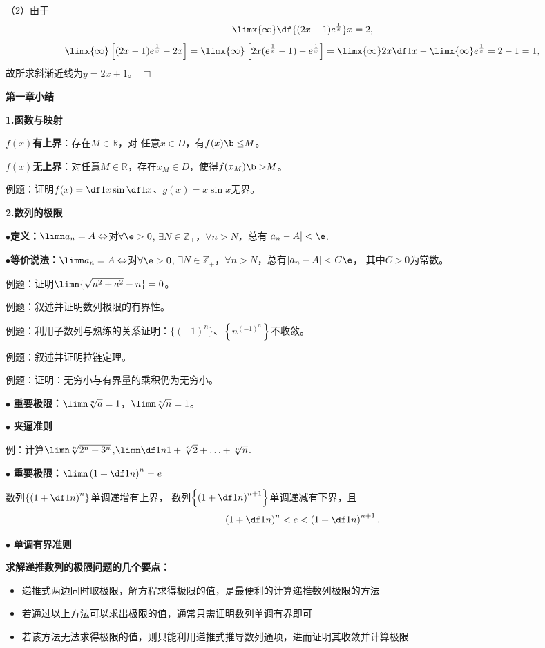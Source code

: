 （2）由于
$$\limx{\infty}\df{(2x-1)e^{\frac1x}}x=2,$$
$$\limx{\infty}\left[(2x-1)e^{\frac1x}-2x\right]
=\limx{\infty}\left[2x(e^{\frac1x}-1)-e^{\frac1x}\right]
=\limx{\infty}2x\df1x-\limx{\infty}e^{\frac1x}=2-1=1,$$
故所求斜渐近线为$y=2x+1$。
\hfill$\Box$

\newpage

\begin{center}
	\Large\bf 第一章小结
\end{center}

{\bf 1.函数与映射}

{\bf $f(x)$有上界}：存在$M\in\mathbb{R}$，对
任意$x\in D$，有$f(x){\b \leq} M$。

{\bf $f(x)$无上界}：对任意$M\in\mathbb{R}$，存在$x_M\in
D$，使得$f(x_M){\b >}M$。

例题：证明$f(x)=\df1x\sin\df1x$、$g(x)=x\sin x$无界。

{\bf 2.数列的极限}

$\bullet${\bf 定义：}$\limn a_n=A\Leftrightarrow$对$\forall\e>0$,
$\exists N\in\mathbb{Z}_+$，$\forall n>N$，总有$|a_n-A|<\e$.

$\bullet${\bf 等价说法：}$\limn a_n=A\Leftrightarrow$对$\forall\e>0$,
$\exists N\in\mathbb{Z}_+$，$\forall n>N$，总有$|a_n-A|<C\e$，
其中$C>0$为常数。

例题：证明$\limn{\sqrt{n^2+a^2}-n}=0$。

例题：叙述并证明数列极限的有界性。

例题：利用子数列与熟练的关系证明：$\{(-1)^n\}$、$\left\{n^{(-1)^n}\right\}$不收敛。

例题：叙述并证明拉链定理。

例题：证明：无穷小与有界量的乘积仍为无穷小。

$\bullet$ {\bf 重要极限：}$\limn\sqrt[n]a=1$，$\limn\sqrt[n]n=1$。

$\bullet$ {\bf 夹逼准则}

例：计算$\limn\sqrt[n]{2^n+3^n}$,$\limn\df1n{1+\sqrt[n]2+\ldots+\sqrt[n]n}$.

$\bullet$ {\bf 重要极限：}$\limn\left(1+\df1n\right)^n=e$

数列$\left\{\left(1+\df1n\right)^n\right\}$单调递增有上界，
数列$\left\{\left(1+\df1n\right)^{n+1}\right\}$单调递减有下界，且
$$\left(1+\df1n\right)^n<e<\left(1+\df1n\right)^{n+1}.$$

$\bullet$ {\bf 单调有界准则}

{\bf 求解递推数列的极限问题的几个要点：}
\begin{itemize}
  \setlength{\itemindent}{1cm}
  \item 递推式两边同时取极限，解方程求得极限的值，是最便利的计算递推数列极限的方法
  \item 若通过以上方法可以求出极限的值，通常只需证明数列单调有界即可
  \item 若该方法无法求得极限的值，则只能利用递推式推导数列通项，进而证明其收敛并计算极限
\end{itemize}

